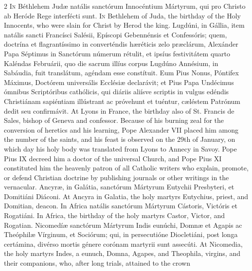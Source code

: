 \begin{paracol}{2}
\lettrine[lines=2]{I}{n} Béthlehem Judæ natális sanctórum Innocéntium 
 Mártyrum, qui pro Christo ab Heróde Rege interfécti sunt.
\switchcolumn
{}
\lettrine[lines=2]{I}{n} Bethlehem of Juda, the birthday of the Holy Innocents, who were slain for 
 Christ by Herod the king.
\switchcolumn*
{}
Lugdúni, in Gállia, item natális sancti Francísci Salésii, Epíscopi Gebennénsis
  et Confessóris; quem, doctrína et flagrantíssimo in converténdis hæréticis
  zelo præclárum, Alexánder Papa Séptimus in Sanctórum númerum rétulit, et
  ipsíus festivitátem quarto Kaléndas Februárii, quo die sacrum illíus corpus
  Lugdúno Annésium, in Sabáudia, fuit translátum, agéndam esse constítuit. Eum
  Pius Nonus, Póntifex Máximus, Doctórem universális Ecclésiæ declarávit; et
  Pius Papa Undécimus ómnibus Scriptóribus cathólicis, qui diáriis aliísve
  scriptis in vulgus edéndis Christiánam sapiéntiam illústrant ac próvehunt et
  tuéntur, cæléstem Patrónum dedit seu confirmávit.
\switchcolumn
{}
At Lyons in France, the birthday also of St. Francis de Sales, bishop of 
 Geneva and confessor. Because of his burning zeal for the conversion 
 of heretics and his learning, Pope Alexander VII placed him among the number 
 of the saints, and his feast is observed on the 29th of January, on which 
 day his holy body was translated from Lyons to Annecy in Savoy. Pope 
 Pius IX decreed him a doctor of the universal Church, and Pope Pius XI 
 constituted him the heavenly patron of all Catholic writers who explain, 
 promote, or defend Christian doctrine by publishing journals or other 
 writings in the vernacular.
\switchcolumn*
{}
Ancyræ, in Galátia, sanctórum Mártyrum Eutychii 
 Presbyteri, et Domitiáni Diáconi.
\switchcolumn
{}
At Ancyra in Galatia, the holy martyrs Eutychius, priest, and Domitian, 
 deacon.
\switchcolumn*
{}
In Africa natális sanctórum Mártyrum Cástoris, 
 Victóris et Rogatiáni.
\switchcolumn
{}
In Africa, the birthday of the holy martyrs Castor, Victor, and Rogatian.
\switchcolumn*
{}
Nicomedíæ sanctórum Mártyrum Indis eunúchi, Domnæ et Agapis ac Theóphilæ
  Vírginum, et Sociórum; qui, in persecutióne Diocletiáni, post longa
  certámina, divérso mortis génere corónam martyrii sunt assecúti.
\switchcolumn
{}
At Nicomedia, the holy martyrs Indes, a eunuch, Domna, Agapes, and Theophila, 
 virgins, and their companions, who, after long trials, attained to the crown 

\end{paracol}
